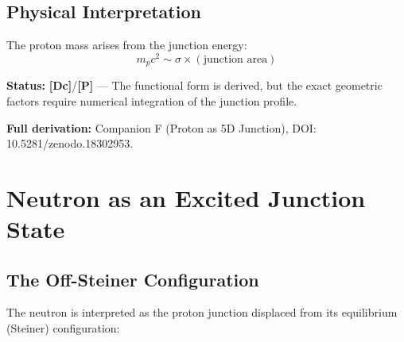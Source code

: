 \documentclass[11pt,a4paper]{article}
\newcommand{\tagP}{\textcolor{red!70!black}{\textbf{[P]}}}
\newcommand{\tagDc}{\textcolor{blue!70!black}{\textbf{[Dc]}}}
\begin{document}
\subsection{Physical Interpretation}

\begin{center}
\end{center}

The proton mass arises from the junction energy:
\begin{equation}
    m_p c^2 \sim \sigma \times (\text{junction area})
\end{equation}

\textbf{Status:} \tagDc{}/\tagP{} --- The functional form is derived, but the exact geometric factors require numerical integration of the junction profile.

\textbf{Full derivation:} Companion F (Proton as 5D Junction), DOI: 10.5281/zenodo.18302953.

\section{Neutron as an Excited Junction State}
\label{sec:neutron_junction}

\subsection{The Off-Steiner Configuration}

The neutron is interpreted as the proton junction displaced from its equilibrium (Steiner) configuration:
\end{document}
